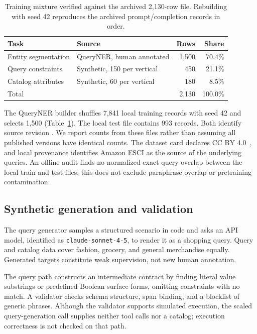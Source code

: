 \documentclass{article}
\newcommand{\code}[1]{\texttt{#1}}
\begin{document}
\begin{table}[t]
\centering
\caption{Training mixture verified against the archived 2,130-row file. Rebuilding with seed 42 reproduces the archived prompt/completion records in order.}
\label{tab:data}
\begin{tabular}{llrr}
\toprule
Task & Source & Rows & Share \\
\midrule
Entity segmentation & QueryNER, human annotated & 1,500 & 70.4\% \\
Query constraints & Synthetic, 150 per vertical & 450 & 21.1\% \\
Catalog attributes & Synthetic, 60 per vertical & 180 & 8.5\% \\
\midrule
Total & & 2,130 & 100.0\% \\
\bottomrule
\end{tabular}
\end{table}

The QueryNER builder shuffles 7,841 local training records with seed 42 and selects 1,500 (Table~\ref{tab:data}). The local test file contains 993 records. Both identify source revision . We report counts from these files rather than assuming all published versions have identical counts. The dataset card declares CC BY 4.0~\cite{querynerdata}, and local provenance identifies Amazon ESCI as the source of the underlying queries. An offline audit finds no normalized exact query overlap between the local train and test files; this does not exclude paraphrase overlap or pretraining contamination.

\subsection{Synthetic generation and validation}
The query generator samples a structured scenario in code and asks an API model, identified as \code{claude-sonnet-4-5}, to render it as a shopping query. Query and catalog data cover fashion, grocery, and general merchandise equally. Generated targets constitute weak supervision, not new human annotation.

The query path constructs an intermediate contract by finding literal value substrings or predefined Boolean surface forms, omitting constraints with no match. A validator checks schema structure, span binding, and a blocklist of generic phrases. Although the validator supports simulated execution, the scaled query-generation call supplies neither tool calls nor a catalog; execution correctness is not checked on that path.
\end{document}
